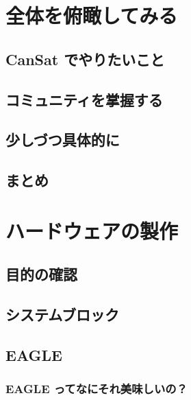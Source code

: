 \documentclass[dvipdfmx]{jsarticle}
\begin{document}
\section{全体を俯瞰してみる}

\subsection{CanSat でやりたいこと}

\subsection{コミュニティを掌握する}

\subsection{少しづつ具体的に}

\subsection{まとめ}

\clearpage

\section{ハードウェアの製作}

\subsection{目的の確認}

\subsection{システムブロック}

\subsection{EAGLE}

\subsubsection{EAGLE ってなにそれ美味しいの？}
\end{document}
